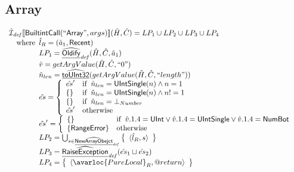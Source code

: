 \subsection{Array}
\[
\begin{array}{l}
\aI_{\it def}\lbr \SF{BuiltintCall}(``\SF{Array}",args)\rbr(\hat{H},\hat{C}) = LP_1 \cup LP_2 \cup LP_3 \cup LP_4\\
\quad\wherec{
  \hat{l}_R = (\hat{a}_1, \SF{Recent})\\
  LP_1 = \ahf{Oldify}_{\it def}(\hat{H},\hat{C}, \hat{a}_1)\\
  \hat{v} = getArgValue(\hat{H},\hat{C}, ``0")\\
  \hat{n}_{len} = \ahf{toUInt32}(getArgValue(\hat{H},\hat{C}, ``length"))\\
  \hat{es} = \left\{\begin{array}{ll}
      \hat{es}' & \ifc{\hat{n}_{len} = \SF{UIntSingle}(n) \land n = 1}\\
      \set{} & \ifc{\hat{n}_{len} = \SF{UIntSingle}(n) \land n != 1}\\
      \set{} & \ifc{\hat{n}_{len} = \bot_{Number}}\\
      \hat{es}' & \owc
    \end{array}\right.\\  
  \hat{es}' = \left\{\begin{array}{ll}
      \set{}
      & \ifc{\hat{v}.1.4 = \SF{UInt} \lor \hat{v}.1.4 = \SF{UIntSingle} \lor \hat{v}.1.4 = \SF{NumBot} }\\
      \{ \SF{RangeError} \} & \owc
    \end{array}\right.\\
  LP_2 = \bigcup_{s \in \ahf{NewArrayObejct}_{\it def}} \set{\langle \hat{l}_R, s\rangle}\\
  LP_3 = \ahf{RaiseException}_{\it def}(\hat{es}_1 \sqcup \hat{es}_2)\\
  LP_4 = \set{\langle\avarloc{PureLocal}_R,\varprop{return}\rangle}\\
  }\\
\\



\end{array}\]

